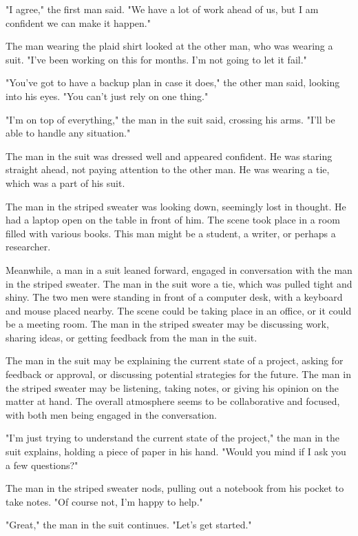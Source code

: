 \documentclass[smalldemyvopaper,11pt,twoside,onecolumn,openright,extrafontsizes]{memoir}
\begin{document}
"I agree," the first man said. "We have a lot of work ahead of us, but I am confident we can make it happen."\par
The man wearing the plaid shirt looked at the other man, who was wearing a suit. "I've been working on this for months. I'm not going to let it fail."\par
"You've got to have a backup plan in case it does," the other man said, looking into his eyes. "You can't just rely on one thing."\par
"I'm on top of everything," the man in the suit said, crossing his arms. "I'll be able to handle any situation."\par
The man in the suit was dressed well and appeared confident. He was staring straight ahead, not paying attention to the other man. He was wearing a tie, which was a part of his suit.\par
The man in the striped sweater was looking down, seemingly lost in thought. He had a laptop open on the table in front of him. The scene took place in a room filled with various books. This man might be a student, a writer, or perhaps a researcher.\par
Meanwhile, a man in a suit leaned forward, engaged in conversation with the man in the striped sweater. The man in the suit wore a tie, which was pulled tight and shiny. The two men were standing in front of a computer desk, with a keyboard and mouse placed nearby. The scene could be taking place in an office, or it could be a meeting room. The man in the striped sweater may be discussing work, sharing ideas, or getting feedback from the man in the suit.\par
The man in the suit may be explaining the current state of a project, asking for feedback or approval, or discussing potential strategies for the future. The man in the striped sweater may be listening, taking notes, or giving his opinion on the matter at hand. The overall atmosphere seems to be collaborative and focused, with both men being engaged in the conversation.\par
"I'm just trying to understand the current state of the project," the man in the suit explains, holding a piece of paper in his hand. "Would you mind if I ask you a few questions?"\par
The man in the striped sweater nods, pulling out a notebook from his pocket to take notes. "Of course not, I'm happy to help."\par
"Great," the man in the suit continues. "Let's get started."\par
\end{document}
